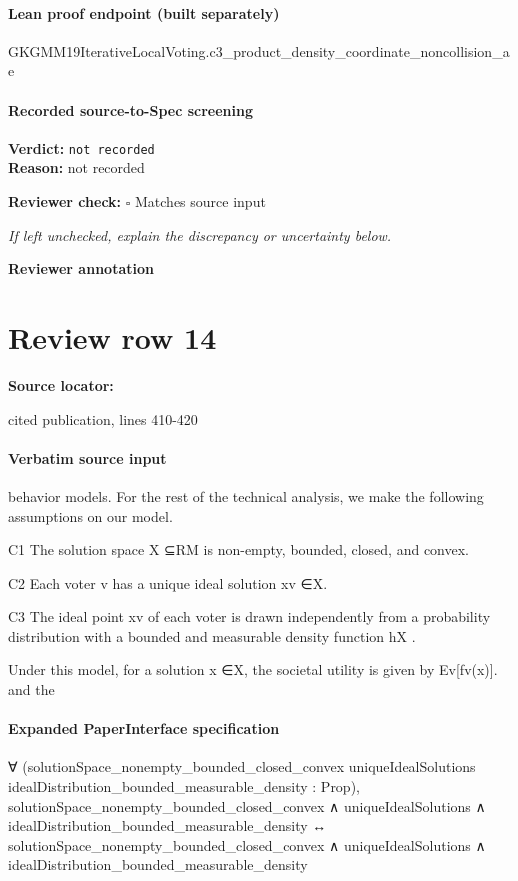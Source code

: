\documentclass[10pt]{article}
\newcommand{\reviewerbox}{%
  \par\noindent\fbox{\parbox{0.96\linewidth}{\rule{0pt}{0.38in}}}\par
}
\newcommand{\reviewmatch}[1]{%
  \par\noindent\textbf{Reviewer check:} $\square$\; #1\par
  \noindent\emph{If left unchecked, explain the discrepancy or uncertainty below.}\par
}
\begin{document}
\paragraph{Lean proof endpoint (built separately)}\begin{ReviewVerbatim}
GKGMM19IterativeLocalVoting.c3_product_density_coordinate_noncollision_ae
\end{ReviewVerbatim}

\paragraph{Recorded source-to-Spec screening}
\textbf{Verdict:} \texttt{not recorded}
\\
\textbf{Reason:} not recorded
\reviewmatch{Matches source input}
\noindent\textbf{Reviewer annotation}\par
\reviewerbox
\clearpage
\hypertarget{source-claim-695aae8edbfcdf18}{}
\section*{Review row 14}
\textbf{Source locator:} {\footnotesize\raggedright cited publication, lines 410-\allowbreak{}420\par}
\paragraph{Verbatim source input}
\begin{ReviewVerbatim}
behavior models. For the rest of the technical analysis, we make the following assumptions
on our model.

C1 The solution space X ⊆RM is non-empty, bounded, closed, and convex.

C2 Each voter v has a unique ideal solution xv ∈X.

C3 The ideal point xv of each voter is drawn independently from a probability distribution
with a bounded and measurable density function hX .

Under this model, for a solution x ∈X, the societal utility is given by Ev[fv(x)]. and the
\end{ReviewVerbatim}


\paragraph{Expanded PaperInterface specification}
\begin{ReviewVerbatim}
∀
  (solutionSpace_nonempty_bounded_closed_convex uniqueIdealSolutions idealDistribution_bounded_measurable_density :
    Prop),
  solutionSpace_nonempty_bounded_closed_convex ∧ uniqueIdealSolutions ∧ idealDistribution_bounded_measurable_density ↔
    solutionSpace_nonempty_bounded_closed_convex ∧ uniqueIdealSolutions ∧ idealDistribution_bounded_measurable_density
\end{ReviewVerbatim}
\end{document}

